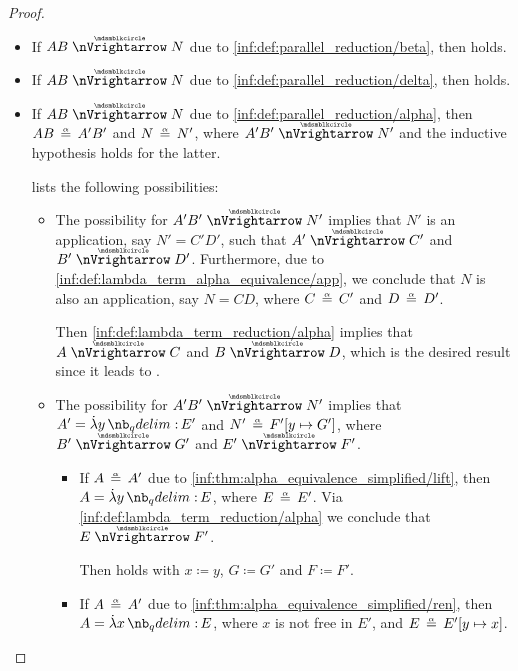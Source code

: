\begin{proof}
\begin{itemize}
    \item If \( AB \ppred N \) due to \ref{inf:def:parallel_reduction/beta}, then  holds.

    \item If \( AB \ppred N \) due to \ref{inf:def:parallel_reduction/delta}, then  holds.

    \item If \( AB \ppred N \) due to \ref{inf:def:parallel_reduction/alpha}, then \( AB \aequiv A' B' \) and \( N \aequiv N' \), where \( A' B' \ppred N' \) and the inductive hypothesis holds for the latter.

     lists the following possibilities:
    \begin{itemize}
      \item The possibility  for \( A' B' \ppred N' \) implies that \( N' \) is an application, say \( N' = C' D' \), such that \( A' \ppred C' \) and \( B' \ppred D' \). Furthermore, due to \ref{inf:def:lambda_term_alpha_equivalence/app}, we conclude that \( N \) is also an application, say \( N = CD \), where \( C \aequiv C' \) and \( D \aequiv D' \).

      Then \ref{inf:def:lambda_term_reduction/alpha} implies that \( A \ppred C \) and \( B \ppred D \), which is the desired result since it leads to .

      \item The possibility  for \( A' B' \ppred N' \) implies that \( A' = \qabs y E' \) and \( N' \aequiv F'[y \mapsto G'] \), where \( B' \ppred G' \) and \( E' \ppred F' \).

      \begin{itemize}
        \item If \( A \aequiv A' \) due to \ref{inf:thm:alpha_equivalence_simplified/lift}, then \( A = \qabs y E \), where \( E \aequiv E' \). Via \ref{inf:def:lambda_term_reduction/alpha} we conclude that \( E \ppred F' \).

        Then  holds with \( x \coloneqq y \), \( G \coloneqq G' \) and \( F \coloneqq F' \).

        \item If \( A \aequiv A' \) due to \ref{inf:thm:alpha_equivalence_simplified/ren}, then \( A = \qabs x E \), where \( x \) is not free in \( E' \), and \( E \aequiv E'[y \mapsto x] \).


\end{itemize}
\end{itemize}
\end{itemize}
\end{proof}
